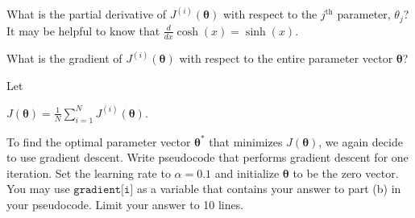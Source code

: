\documentclass[11pt,addpoints,answers]{exam}
\begin{document}
\begin{questions}
\begin{parts}
\begin{subparts}

        
        \subpart[3] 
         What is the partial derivative of $J^{(i)}(\bm\theta)$ with respect to the $j^{\textrm{th}}$ parameter, $\theta_j$? It may be helpful to know that $\frac{d}{dx}\cosh(x) = \sinh(x)$. 
         
        \begin{your_solution}[title=Your answer:,height=6cm,width=15cm]
        \end{your_solution}
        
        \subpart[2] 
         What is the gradient of $J^{(i)}(\bm\theta)$ with respect to the entire parameter vector $\bm\theta$?
         
        \begin{your_solution}[title=Your answer:,height=4cm,width=15cm]
        \end{your_solution}
        

        \subpart[2] Let 
        
        \begin{center} $J(\bm\theta) = \frac1N \sum\limits_{i=1}^{N} J^{(i)}(\bm\theta).$ 
        \end{center}
        
        To find the optimal parameter vector $\bm\theta^*$ that minimizes $J(\bm\theta)$, we again decide to use gradient descent. Write pseudocode that performs gradient descent for one iteration. Set the learning rate to $\alpha = 0.1$ and initialize $\bm\theta$ to be the zero vector. You may use $\texttt{gradient[i]}$ as a variable that contains your answer to part (b) in your pseudocode. Limit your answer to 10 lines.

        \begin{your_solution}[title=Your Answer,height=5.5cm,width=15cm]
            
        \begin{your_code_solution}

        \end{your_code_solution}
            
        \end{your_solution}
        
        
    \end{subparts}
    
\end{parts}



\end{questions}
\end{document}
